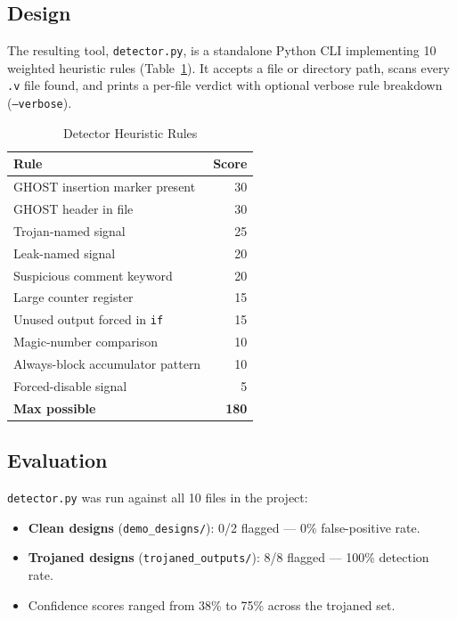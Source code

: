 \documentclass[11pt]{article}
\begin{document}
\subsection{Design}

The resulting tool, \texttt{detector.py}, is a standalone Python CLI implementing 10 weighted heuristic rules (Table~\ref{tab:rules}). It accepts a file or directory path, scans every \texttt{.v} file found, and prints a per-file verdict with optional verbose rule breakdown (\texttt{--verbose}).

\begin{table}[h]
\centering
\caption{Detector Heuristic Rules}
\label{tab:rules}
\fontsize{10}{12}\selectfont
\begin{tabular}{@{}p{6cm}r@{}}
\toprule
\textbf{Rule} & \textbf{Score} \\
\midrule
GHOST insertion marker present    & 30 \\
GHOST header in file              & 30 \\
Trojan-named signal               & 25 \\
Leak-named signal                 & 20 \\
Suspicious comment keyword        & 20 \\
Large counter register            & 15 \\
Unused output forced in \texttt{if} & 15 \\
Magic-number comparison           & 10 \\
Always-block accumulator pattern  & 10 \\
Forced-disable signal             &  5 \\
\midrule
\textbf{Max possible}             & \textbf{180} \\
\bottomrule
\end{tabular}
\end{table}

\subsection{Evaluation}

\texttt{detector.py} was run against all 10 files in the project:
\begin{itemize}[leftmargin=*, itemsep=0pt, topsep=2pt]
  \item \textbf{Clean designs} (\texttt{demo\_designs/}): 0/2 flagged --- 0\% false-positive rate.
  \item \textbf{Trojaned designs} (\texttt{trojaned\_outputs/}): 8/8 flagged --- 100\% detection rate.
  \item Confidence scores ranged from 38\% to 75\% across the trojaned set.
\end{itemize}
\end{document}
